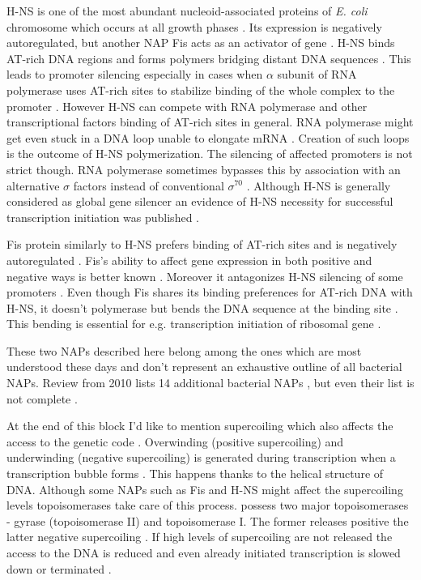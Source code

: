 H-NS is one of the most abundant nucleoid-associated proteins of \textit{E. coli} chromosome which occurs at all growth phases \cite{azam1999growth}.
Its expression is negatively autoregulated, but another NAP Fis acts as an activator of  gene \cite{ueguchi1993autoregulatory, falconi1996antagonistic}.
H-NS binds AT-rich DNA regions and forms polymers bridging distant DNA sequences  \cite{navarre2006selective, arold2010h}.
This leads to promoter silencing especially in cases when $\alpha$ subunit of RNA polymerase uses AT-rich sites to stabilize binding of the whole complex to the promoter \cite{singh2013h}.
However H-NS can compete with RNA polymerase and other transcriptional factors binding of AT-rich sites in general.
RNA polymerase might get even stuck in a DNA loop unable to elongate mRNA \cite{dame2002structural}.
Creation of such loops is the outcome of H-NS polymerization.
The silencing of affected promoters is not strict though.
RNA polymerase sometimes bypasses this by association with an alternative $\sigma$ factors instead of conventional $\sigma^{70}$ \cite{grainger2008selective}.
Although H-NS is generally considered as global gene silencer an evidence of H-NS necessity for successful transcription initiation was published \cite{singh2013h}.

Fis protein similarly to H-NS prefers binding of AT-rich sites and is negatively autoregulated \cite{ball1992dramatic, stella2010shape}.
Fis's ability to affect gene expression in both positive and negative ways is better known \cite{choi2005effects, karambelkar2012silencing}.
Moreover it antagonizes H-NS silencing of some promoters \cite{falconi2001involvement}.
Even though Fis shares its binding preferences for AT-rich DNA with H-NS, it doesn't polymerase but bends the DNA sequence at the binding site \cite{hubner1989bent}.
This bending is essential for e.g. transcription initiation of ribosomal gene  \cite{gosink1993dna}.

These two NAPs described here belong among the ones which are most understood these days and don't represent an exhaustive outline of all bacterial NAPs.
Review from 2010 lists 14 additional bacterial NAPs \cite{dillon2010bacterial}, but even their list is not complete \cite{aznar2013hha}.

At the end of this block I'd like to mention supercoiling which also affects the access to the genetic code \cite{brahms1985activation}.
Overwinding (positive supercoiling) and underwinding (negative supercoiling) is generated during transcription when a transcription bubble forms \cite{wu1988transcription}.
This happens thanks to the helical structure of DNA.
Although some NAPs such as Fis and H-NS might affect the supercoiling levels \cite{ouafa2012nucleoid} topoisomerases take care of this process.
 possess two major topoisomerases - gyrase (topoisomerase II) and topoisomerase I.
The former releases positive the latter negative supercoiling \cite{wang1971interaction, gellert1976dna}.
If high levels of supercoiling are not released the access to the DNA is reduced and even already initiated transcription is slowed down or terminated \cite{chong2014mechanism}.

